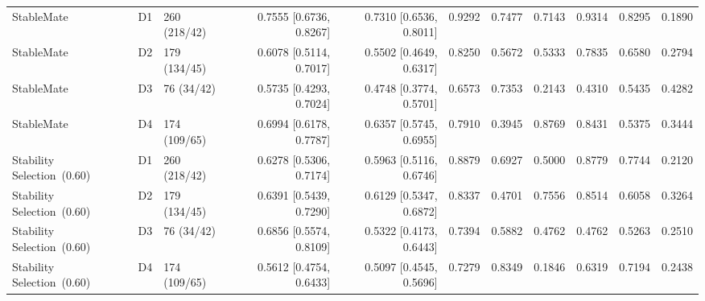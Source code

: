 \begin{table}[!htbp]
\begin{tabular}{@{}lllrrrrrrrr@{}}
\midrule
StableMate & D1 & 260 (218/42) & 0.7555 [0.6736, 0.8267] & 0.7310 [0.6536, 0.8011] & 0.9292 & 0.7477 & 0.7143 & 0.9314 & 0.8295 & 0.1890 \\
StableMate & D2 & 179 (134/45) & 0.6078 [0.5114, 0.7017] & 0.5502 [0.4649, 0.6317] & 0.8250 & 0.5672 & 0.5333 & 0.7835 & 0.6580 & 0.2794 \\
StableMate & D3 & 76 (34/42) & 0.5735 [0.4293, 0.7024] & 0.4748 [0.3774, 0.5701] & 0.6573 & 0.7353 & 0.2143 & 0.4310 & 0.5435 & 0.4282 \\
StableMate & D4 & 174 (109/65) & 0.6994 [0.6178, 0.7787] & 0.6357 [0.5745, 0.6955] & 0.7910 & 0.3945 & 0.8769 & 0.8431 & 0.5375 & 0.3444 \\
\midrule
Stability Selection\ (0.60) & D1 & 260 (218/42) & 0.6278 [0.5306, 0.7174] & 0.5963 [0.5116, 0.6746] & 0.8879 & 0.6927 & 0.5000 & 0.8779 & 0.7744 & 0.2120 \\
Stability Selection\ (0.60) & D2 & 179 (134/45) & 0.6391 [0.5439, 0.7290] & 0.6129 [0.5347, 0.6872] & 0.8337 & 0.4701 & 0.7556 & 0.8514 & 0.6058 & 0.3264 \\
Stability Selection\ (0.60) & D3 & 76 (34/42) & 0.6856 [0.5574, 0.8109] & 0.5322 [0.4173, 0.6443] & 0.7394 & 0.5882 & 0.4762 & 0.4762 & 0.5263 & 0.2510 \\
Stability Selection\ (0.60) & D4 & 174 (109/65) & 0.5612 [0.4754, 0.6433] & 0.5097 [0.4545, 0.5696] & 0.7279 & 0.8349 & 0.1846 & 0.6319 & 0.7194 & 0.2438 \\
\bottomrule
\end{tabular}
\end{table}

